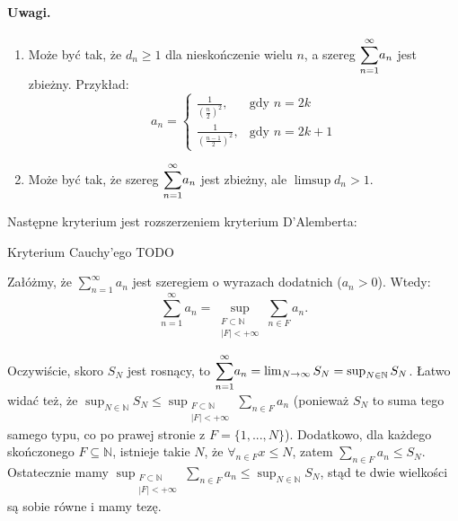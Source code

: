 \documentclass{article}
\numberwithin{defi}{section}
\numberwithin{defi}{section}
\newcommand{\N}{\mathbb{N}}
\newcommand{\oo}{\infty}
\newcommand{\se}{\subseteq}
\renewcommand{\geq}{\geqslant}
\renewcommand{\leq}{\leqslant}
\newcommand{\bsum}[2]{\mathlarger{\sum_{#1}^{#2}}}
\newcommand{\szerI}[1]{\bsum{n=1}{\oo} #1_n}
\newcommand{\gras}[2]{\lim_{#1 \to \oo} #2_{#1}}
\begin{document}
\paragraph{Uwagi.} \begin{enumerate}
    \item Może być tak, że $d_n \geq 1$ dla nieskończenie wielu $n$, a szereg $\szerI{a}$ jest zbieżny. Przykład: \begin{equation*}
        a_n = \begin{cases}
            \frac{1}{(\frac{n}{2})^2}, & \text{gdy } n  = 2k \\
            \frac{1}{(\frac{n-1}{2})^2}, &\text{gdy } n = 2k+ 1
        \end{cases}
    \end{equation*}
    \item Może być tak, że szereg $\szerI{a}$ jest zbieżny, ale $\limsup d_n > 1$. 
\end{enumerate}


Następne kryterium jest rozszerzeniem kryterium D'Alemberta: 
\begin{twier}{Kryterium Cauchy'ego}
TODO
    
\end{twier}


\begin{twier}{}
    Załóżmy, że $\sum_{n=1}^{\infty} a_n$ jest szeregiem o wyrazach dodatnich ($a_n > 0$). Wtedy:
    \begin{equation}
        \sum\limits_{n=1}^{\infty} a_n = \sup_{\substack{F \subset \N \\ |F| < +\infty}} \sum_{n \in F} a_n.
    \end{equation}
\end{twier}

\begin{dow}
    Oczywiście, skoro $S_N$ jest rosnący, to $\szerI{a} = \gras{N}{S} = \sup_{N \in \N} S_N$. Łatwo widać też, że $\sup_{N \in \N} S_N \leq \sup_{\substack{F \subset \N \\ |F| < +\infty}} \sum_{n \in F} a_n$ (ponieważ $S_N$ to suma tego samego typu, co po prawej stronie z $F = \{1, ..., N\}$). Dodatkowo, dla każdego skończonego $F \se \N$, istnieje takie $N$, że $\forall_{n \in F} x \leq N$, zatem $\sum_{n \in F} a_n \leq S_N$. Ostatecznie mamy $ \sup_{\substack{F \subset \N \\ |F| < +\infty}} \sum_{n \in F} a_n \leq \sup_{N \in \N} S_N$, stąd te dwie wielkości są sobie równe i mamy tezę.
\end{dow}
\end{document}
